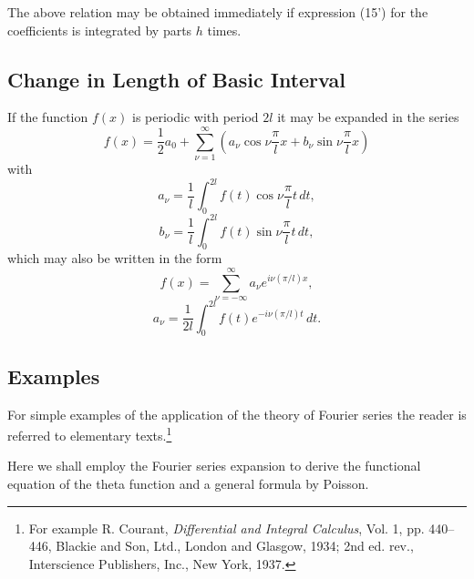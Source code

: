 The above relation may be obtained immediately if expression (15') for the coefficients is integrated by parts $h$ times.

\subsection{Change in Length of Basic Interval}
If the function $f(x)$ is periodic with period $2l$ it may be expanded in the series
\[
f(x)=\frac12a_0+\sum_{\nu=1}^{\infty}\left(a_\nu\cos\nu\frac{\pi}{l}x+b_\nu\sin\nu\frac{\pi}{l}x\right)
\]
with
\[
a_\nu=\frac1l\int_{0}^{2l}f(t)\cos\nu\frac{\pi}{l}t\,dt,
\]
\[
b_\nu=\frac1l\int_{0}^{2l}f(t)\sin\nu\frac{\pi}{l}t\,dt,
\]
which may also be written in the form
\[
f(x)=\sum_{\nu=-\infty}^{\infty}a_\nu e^{i\nu(\pi/l)x},
\]
\[
a_\nu=\frac1{2l}\int_{0}^{2l}f(t)e^{-i\nu(\pi/l)t}\,dt.
\]

\subsection{Examples}
For simple examples of the application of the theory of Fourier series the reader is referred to elementary texts.\footnote{For example R. Courant, \emph{Differential and Integral Calculus}, Vol. 1, pp. 440--446, Blackie and Son, Ltd., London and Glasgow, 1934; 2nd ed. rev., Interscience Publishers, Inc., New York, 1937.}

Here we shall employ the Fourier series expansion to derive the functional equation of the theta function and a general formula by Poisson.


